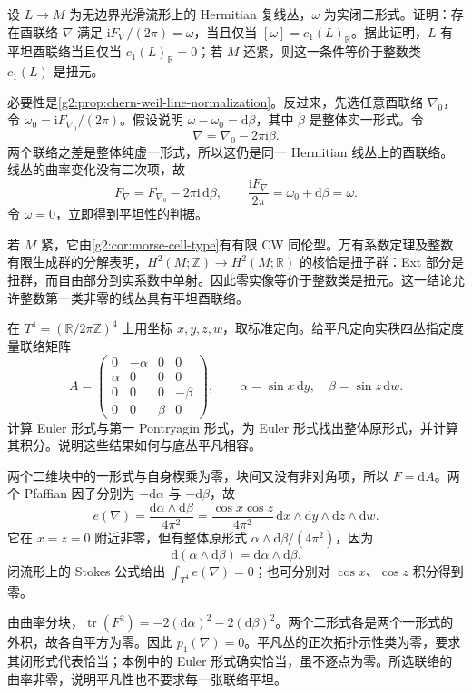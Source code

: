 \begin{exercise}\label{g2:ex:prescribed-line-curvature}
	设 \(L\to M\) 为无边界光滑流形上的 Hermitian 复线丛，\(\omega\) 为实闭二形式。证明：存在酉联络 \(\nabla\) 满足 \(\mathrm iF_\nabla/(2\pi)=\omega\)，当且仅当 \([\omega]=c_1(L)_{\mathbb R}\)。据此证明，\(L\) 有平坦酉联络当且仅当 \(c_1(L)_{\mathbb R}=0\)；若 \(M\) 还紧，则这一条件等价于整数类 \(c_1(L)\) 是扭元。
\end{exercise}
\begin{solution}
	必要性是\cref{g2:prop:chern-weil-line-normalization}。反过来，先选任意酉联络 \(\nabla_0\)，令 \(\omega_0=\mathrm iF_{\nabla_0}/(2\pi)\)。假设说明 \(\omega-\omega_0=\mathrm d\beta\)，其中 \(\beta\) 是整体实一形式。令
	\[
		\nabla=\nabla_0-2\pi\mathrm i\beta.
	\]
	两个联络之差是整体纯虚一形式，所以这仍是同一 Hermitian 线丛上的酉联络。线丛的曲率变化没有二次项，故
	\[
		F_\nabla=F_{\nabla_0}-2\pi\mathrm i\,\mathrm d\beta,
		\qquad \frac{\mathrm iF_\nabla}{2\pi}=\omega_0+\mathrm d\beta=\omega.
	\]
	令 \(\omega=0\)，立即得到平坦性的判据。

	若 \(M\) 紧，它由\cref{g2:cor:morse-cell-type}有有限 CW 同伦型。万有系数定理及整数有限生成群的分解表明，\(H^2(M;\mathbb Z)\to H^2(M;\mathbb R)\) 的核恰是扭子群：Ext 部分是扭群，而自由部分到实系数中单射。因此零实像等价于整数类是扭元。这一结论允许整数第一类非零的线丛具有平坦酉联络。
\end{solution}

\begin{exercise}\label{g2:ex:exact-euler-form-torus}
	在 \(T^4=(\mathbb R/2\pi\mathbb Z)^4\) 上用坐标 \(x,y,z,w\)，取标准定向。给平凡定向实秩四丛指定度量联络矩阵
	\[
		A=\begin{pmatrix}
			0&-\alpha&0&0\\\alpha&0&0&0\\
			0&0&0&-\beta\\0&0&\beta&0
		\end{pmatrix},\qquad
		\alpha=\sin x\,\mathrm dy,\quad\beta=\sin z\,\mathrm dw.
	\]
	计算 Euler 形式与第一 Pontryagin 形式，为 Euler 形式找出整体原形式，并计算其积分。说明这些结果如何与底丛平凡相容。
\end{exercise}
\begin{solution}
	两个二维块中的一形式与自身楔乘为零，块间又没有非对角项，所以 \(F=\mathrm dA\)。两个 Pfaffian 因子分别为 \(-\mathrm d\alpha\) 与 \(-\mathrm d\beta\)，故
	\[
		e(\nabla)=\frac{\mathrm d\alpha\wedge\mathrm d\beta}{4\pi^2}
		=\frac{\cos x\cos z}{4\pi^2}\,\mathrm dx\wedge\mathrm dy\wedge\mathrm dz\wedge\mathrm dw.
	\]
	它在 \(x=z=0\) 附近非零，但有整体原形式 \(\alpha\wedge\mathrm d\beta/(4\pi^2)\)，因为
	\[
		\mathrm d(\alpha\wedge\mathrm d\beta)=\mathrm d\alpha\wedge\mathrm d\beta.
	\]
	闭流形上的 Stokes 公式给出 \(\int_{T^4}e(\nabla)=0\)；也可分别对 \(\cos x\)、\(\cos z\) 积分得到零。

	由曲率分块，\(\operatorname{tr}(F^2)=-2(\mathrm d\alpha)^2-2(\mathrm d\beta)^2\)。两个二形式各是两个一形式的外积，故各自平方为零。因此 \(p_1(\nabla)=0\)。平凡丛的正次拓扑示性类为零，要求其闭形式代表恰当；本例中的 Euler 形式确实恰当，虽不逐点为零。所选联络的曲率非零，说明平凡性也不要求每一张联络平坦。
\end{solution}

